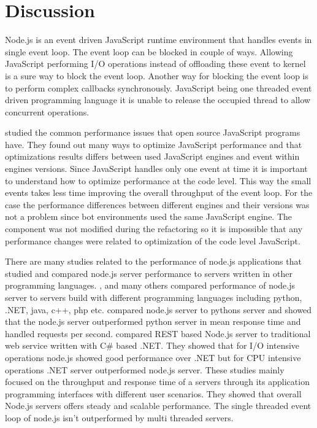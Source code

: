 \chapter{Discussion\label{discussion}}
Node.js is an event driven JavaScript runtime environment that handles events in single event loop.
The event loop can be blocked in couple of ways.
Allowing JavaScript performing I/O operations instead of offloading these event to kernel is a sure way to block the event loop.
Another way for blocking the event loop is to perform complex callbacks synchronously.
JavaScript being one threaded event driven programming language it is unable to release the occupied thread to allow concurrent operations.

\cite{SelakovicPerformanceIssues} studied the common performance issues that open source JavaScript programs have.
They found out many ways to optimize JavaScript performance and that optimizations results differs between used JavaScript engines and event within engines versions.
Since JavaScript handles only one event at time it is important to understand how to optimize performance at the code level.
This way the small events takes less time improving the overall throughput of the event loop.
For the case the performance differences between different engines and their versions was not a problem since bot environments used the same JavaScript engine.
The component was not modified during the refactoring so it is impossible that any performance changes were related to optimization of the code level JavaScript.

There are many studies related to the performance of node.js applications that studied and compared node.js server performance to servers written in other programming languages.
\cite{Challapalli}, \cite{Lion} and many others compared performance of node.js server to servers build with different programming languages including python, .NET, java, c++, php etc.
\cite{Challapalli} compared node.js server to pythons server and showed that the node.js server outperformed python server in mean response time and handled requests per second.
\cite{Chitra} compared REST based Node.js server to traditional web service written with C\# based .NET.
They showed that for I/O intensive operations node.js showed good performance over .NET but
for CPU intensive operations .NET server outperformed node.js server.
These studies mainly focused on the throughput and response time of a servers through its application programming interfaces with different user scenarios.
They showed that overall Node.js servers offers steady and scalable performance.
The single threaded event loop of node.js isn't outperformed by multi threaded servers.

